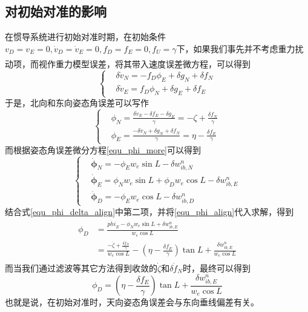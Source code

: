 \documentclass[12pt,a4,utf8]{article}
\newcommand{\upcite}[1]{\textsuperscript{\textsuperscript{\cite{#1}}}} %
\begin{document}
\subsection{对初始对准的影响}
在惯导系统进行初始对准时期，在初始条件$v_D =v_E=0, \dot{v}_D=\dot{v}_E = 0, f_D = f_E = 0, f_U = \gamma$下，如果我们事先并不考虑重力扰动项\upcite{LUOKAIXIN2023}，而视作重力模型误差，将其带入速度误差微方程，可以得到
\begin{equation}
      \left\{ \begin{aligned}
            &\delta \dot{v}_N = -f_D\phi_E + \delta g_N + \delta f_N
            \\
            &\delta \dot{v}_E = f_D\phi_N + \delta g_E + \delta f_E
      \end{aligned} \right.
\end{equation}
于是，北向和东向姿态角误差可以写作
\begin{equation}
      \left\{ \begin{aligned}
            &\phi_N = \frac{\delta \dot{v}_E - \delta f_E - \delta g_E}{\gamma} = - \zeta + \frac{\delta f_N}{\gamma}
            \\
            &\phi_E = \frac{-\delta \dot{v}_N + \delta g_N + \delta f_N}{\gamma} = \eta - \frac{\delta f_E}{\gamma}
      \end{aligned} \right.
      \label{equ_phi_align}
\end{equation}
而根据姿态角误差微分方程\ref{equ_phi_more}可以得到
\begin{equation}
      \left\{ \begin{aligned}
      & \dot{\bm{\phi}}_N=-\phi_E w_e\sin L - \delta w^n_{ib,N} 
      \\ 
      & \dot{\bm{\phi}}_E= \phi_N w_e \sin L + \phi_D w_e \cos L - \delta w^n_{ib,E}
      \\ 
      & \dot{\bm{\phi}}_D = -\phi_E w_e \cos L - \delta w^n_{ib,D}
\end{aligned} \right.
\label{equ_phi_delta_align}
\end{equation}
结合式\ref{equ_phi_delta_align}中第二项，并将\ref{equ_phi_align}代入求解，得到
\begin{equation}
      \begin{aligned}
      \phi_D &= \frac{\dot{phi}_E - \phi_N w_e \sin L +\delta w^n_{ib,E}}{w_e\cos L}
      \\
      &= \frac{-\dot{\zeta} + \frac{\delta \dot{f}_N}{\gamma}}{w_e\cos L} - (\eta - \frac{\delta f_E}{\gamma})\tan L + \frac{\delta w^n_{ib,E}}{w_e\cos L}
      \end{aligned}
\end{equation}
而当我们通过滤波等其它方法得到收敛的$\dot{\zeta}$和$ \delta \dot{f}_N$时\upcite{soler2014deflection}，最终可以得到
\begin{equation}
      \phi_D = (\eta - \frac{\delta f_E}{\gamma})\tan L + \frac{\delta w^n_{ib,E}}{w_e\cos L}
\end{equation}
也就是说，在初始对准时，天向姿态角误差会与东向垂线偏差有关。
\end{document}
